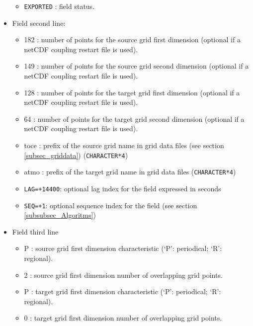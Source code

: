 \begin{itemize}
\begin{itemize}
        \item {\tt EXPORTED} : field status.
        \end{itemize}
      \item Field second line:
        \begin{itemize}
        \item 182 : number of points for the source grid first
        dimension (optional if a netCDF coupling restart file is used). 
        \item 149 : number of points for the source grid second
        dimension (optional if a netCDF coupling restart file is used).    
        \item 128 : number of points for the target grid first
        dimension (optional if a netCDF coupling restart file is used). 
        \item 64 : number of points for the target grid second
        dimension (optional if a netCDF coupling restart file is used).  
        \item toce : prefix of the source grid name in grid data files (see section
        \ref{subsec_griddata}) ({\tt CHARACTER*4})
        \item atmo : prefix of the target grid name in grid data files
        ({\tt CHARACTER*4})
        \item {\tt LAG=+14400}: optional lag index for the field
        expressed in seconds 
        \item {\tt SEQ=+1}: optional sequence index for the field (see section  \ref{subsubsec_Algoritms})
        \end{itemize}
      \item Field third line
        \begin{itemize}
         \item P : source grid first dimension characteristic
            (`P': periodical; `R': regional).
         \item 2 : source grid first dimension number of overlapping grid points.
         \item P : target grid first dimension characteristic (`P':
         periodical; `R': regional).
         \item 0 : target grid first dimension number of overlapping grid points.
        \end{itemize}
     
      \end{itemize}
    
